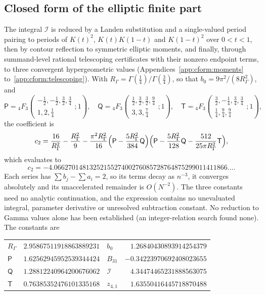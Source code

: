 \documentclass[11pt,a4paper]{article}
\numberwithin{equation}{section}
\newcommand{\cI}{\mathcal I}
\newcommand{\pFq}[3]{{}_4F_3\!\left(\begin{matrix}#1\\[1pt]#2\end{matrix};#3\right)}
\begin{document}
\subsection{Closed form of the elliptic finite part}\label{sec:closed2}
The integral $\cI$ is reduced by a Landen substitution and a single-valued period pairing to periods of $K(t)^2$,
$K(t)K(1-t)$ and $K(1-t)^2$ over $0<t<1$, then by contour reflection to symmetric elliptic moments, and finally, through summand-level rational telescoping certificates with
their nonzero endpoint terms, to three convergent hypergeometric values (Appendices~\ref{app:cform:moments} to~\ref{app:cform:telescoping}). With $R_\Gamma=\Gamma(\frac14)/\Gamma(\frac34)$,
so that $b_0=9\pi^2/(8R_\Gamma^2)$, and
\begin{equation}
 \mathsf P=\pFq{-\frac12,-\frac12,\frac32,\frac34}{1,2,\frac14}{1},\quad
 \mathsf Q=\pFq{\frac12,\frac32,\frac32,\frac94}{3,3,\frac74}{1},\quad
 \mathsf T=\pFq{\frac32,-\frac14,\frac34,\frac34}{\frac14,\frac94,\frac94}{1},
\end{equation}
the coefficient is
\begin{equation}
 c_2=\frac{16}{R_\Gamma^2}-\frac{R_\Gamma^2}{9}
 -\frac{\pi^2R_\Gamma^2}{16}\Bigl(\mathsf P-\frac{5R_\Gamma^2}{384}\mathsf Q\Bigr)
 \Bigl(\mathsf P-\frac{5R_\Gamma^2}{128}\mathsf Q-\frac{512}{25\pi R_\Gamma^2}\mathsf T\Bigr),
 \label{eq:c2closed}
\end{equation}
which evaluates to
\begin{equation}
 c_2=-4.0662701481325215527400276085728764875299011411866\ldots .
 \label{eq:c2num}
\end{equation}
Each series has $\sum b_j-\sum a_i=2$, so its terms decay as $n^{-3}$, it converges absolutely and its unaccelerated
remainder is $O(N^{-2})$. The three constants need no analytic continuation, and the expression contains no unevaluated
integral, parameter derivative or unresolved subtraction constant. No reduction to
Gamma values alone has been established (an integer-relation search found none). The constants are
\begin{center}\small
\begin{tabular}{@{}lr@{\qquad}lr@{}}
\toprule
$R_\Gamma$ & $2.95867511918863889231$ & $b_0$ & $1.26840430893914254379$\\
$\mathsf P$ & $1.62562945952539344424$ & $B_{31}$ & $-0.34223970692408023655$\\
$\mathsf Q$ & $1.28812240964200676062$ & $\cI$ & $4.34474465231888563075$\\
$\mathsf T$ & $0.76385352476101335168$ & $z_{4,1}$ & $1.63550416445718870488$\\
\bottomrule
\end{tabular}
\end{center}
\end{document}
